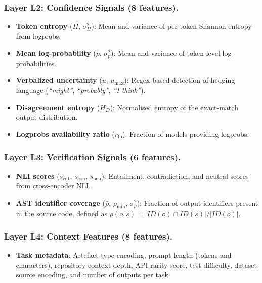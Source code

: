 \documentclass[11pt,a4paper]{article}
\begin{document}
\subsubsection{Layer L2: Confidence Signals (8 features).}
\begin{itemize}
\item \textbf{Token entropy} ($\bar{H}$, $\sigma^2_H$): Mean and variance of per-token Shannon entropy from logprobs.
\item \textbf{Mean log-probability} ($\bar{p}$, $\sigma^2_p$): Mean and variance of token-level log-probabilities.
\item \textbf{Verbalized uncertainty} ($\bar{u}$, $u_\mathrm{max}$): Regex-based detection of hedging language (\textit{``might''}, \textit{``probably''}, \textit{``I think''}).
\item \textbf{Disagreement entropy} ($H_D$): Normalised entropy of the exact-match output distribution.
\item \textbf{Logprobs availability ratio} ($r_\mathrm{lp}$): Fraction of models providing logprobs.
\end{itemize}

\subsubsection{Layer L3: Verification Signals (6 features).}
\begin{itemize}
\item \textbf{NLI scores} ($s_\mathrm{ent}$, $s_\mathrm{con}$, $s_\mathrm{neu}$): Entailment, contradiction, and neutral scores from cross-encoder NLI.
\item \textbf{AST identifier coverage} ($\bar{\rho}$, $\rho_\mathrm{min}$, $\sigma^2_\rho$): Fraction of output identifiers present in the source code, defined as $\rho(o,s) = |ID(o) \cap ID(s)| / |ID(o)|$.
\end{itemize}

\subsubsection{Layer L4: Context Features (8 features).}
\begin{itemize}
\item \textbf{Task metadata}: Artefact type encoding, prompt length (tokens and characters), repository context depth, API rarity score, test difficulty, dataset source encoding, and number of outputs per task.
\end{itemize}
\end{document}
